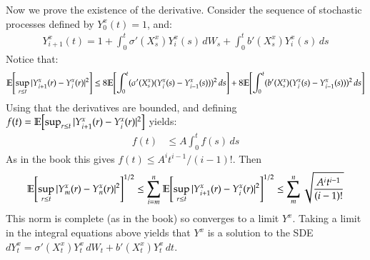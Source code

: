 \documentclass[12pt]{article}
\theoremstyle{definitionstyle}
\newcommand{\1}{\mathds 1}
\newcommand{\E}{\mathbb E \qty}
\begin{document}
    Now we prove the existence of the derivative. Consider the sequence of stochastic processes defined by $Y_0^x(t) = 1$, and:
    \begin{align*}
        Y_{i+1}^x(t) = 1 + \int_0^t \sigma'(X_s^x) Y_i^x(s) \, dW_s + \int_0^t b'(X_s^x) Y_i^x(s) \, ds
    \end{align*}
    Notice that:
    \begin{align*}
        \E[\sup_{r \leq t} |Y_{i+1}^x(r) - Y_i^x(r)|^2] &\leq 8\E[\int_0^t (\sigma'(X_s^x)(Y_i^x(s) - Y_{i-1}^x(s)))^2 \, ds] + 8\E[\int_0^t (b'(X_s^x)(Y_i^x(s) - Y_{i-1}^x(s)))^2 \, ds] \\
    \end{align*}
    Using that the derivatives are bounded, and defining $f(t) = \E[\sup_{r \leq t} |Y_{i+1}^x(r) - Y_i^x(r)|^2]$ yields:
    \begin{align*}
        f(t) &\leq A \int_0^t f(s) \, ds
    \end{align*}
    As in the book this gives $f(t) \leq A^i t^{i-1} / (i-1)!$. Then 
    \begin{align*}
        \E[\sup_{r \leq t} |Y_m^x(r) - Y_n^x(r)|^2]^{1/2} \leq \sum_{i=m}^n \E[\sup_{r \leq t} |Y_{i+1}^x(r) - Y_i^x(r)|^2]^{1/2} \leq \sum_{m}^n \sqrt{\frac{A^i t^{i-1}}{(i-1)!}}
    \end{align*}
    This norm is complete (as in the book) so converges to a limit $Y^x$. Taking a limit in the integral equations above yields that $Y^x$ is a solution to the SDE $dY^x_t = \sigma'(X_t^x) Y^x_t\, dW_t + b'(X_t^x) Y^x_t \, dt$. 
\end{document}
